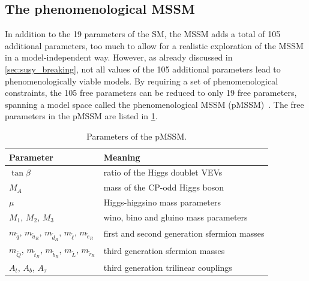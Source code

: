 \subsection{The phenomenological MSSM}

In addition to the 19 parameters of the SM, the MSSM adds a total of 105 additional parameters, too much to allow for a realistic exploration of the MSSM in a model-independent way. However, as already discussed in \cref{sec:susy_breaking}, not all values of the 105 additional parameters lead to phenomenologically viable models. By requiring a set of phenomenological constraints, the 105 free parameters can be reduced to only 19 free parameters, spanning a model space called the phenomenological MSSM (pMSSM)~\cite{Djouadi:2002ze,Berger_2009}. The free parameters in the pMSSM are listed in \cref{tab:parameters_pmssm}.

\begin{table}
	\centering
	\setlength\heavyrulewidth{0.2ex}
	\small
	\caption{Parameters of the pMSSM.}
	\begin{tabular} {l l}
	\toprule
		Parameter & Meaning \\ 
	\midrule
	$\tan{\beta}$ & ratio of the Higgs doublet VEVs \\
	$M_A$ & mass of the CP-odd Higgs boson \\
	$\mu$ & Higgs-higgsino mass parameters \\
	$M_1$, $M_2$, $M_3$ & wino, bino and gluino mass parameters \\
	$m_{\tilde{q}}$, $m_{\tilde{u}_R}$, $m_{\tilde{d}_R}$, $m_{\tilde{\ell}}$, $m_{\tilde{e}_R}$ & first and second generation sfermion masses \\
	$m_{\tilde{Q}}$, $m_{\tilde{t}_R}$, $m_{\tilde{b}_R}$, $m_{\tilde{L}}$, $m_{\tilde{\tau}_R}$ & third generation sfermion masses \\
	$A_t$, $A_b$, $A_\tau$ & third generation trilinear couplings \\
	\bottomrule					
	\end{tabular}\vspace{3mm}
	\label{tab:parameters_pmssm}   
\end{table}

